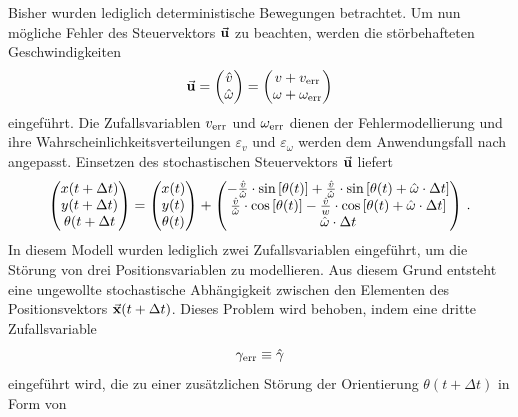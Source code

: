 Bisher wurden lediglich deterministische Bewegungen betrachtet. Um nun mögliche Fehler des Steuervektors $\vec{\mathbf{u}}$ zu beachten, werden die störbehafteten Geschwindigkeiten
\begin{equation}
\vec{\mathbf{u}} = \begin{pmatrix}
\hat{v} \\ \hat{\omega}
\end{pmatrix} = \begin{pmatrix}
v + v_{\text{err}} \\ \omega + \omega_{\text{err}}
\end{pmatrix}
\end{equation}
eingeführt. Die Zufallsvariablen $v_{\text{err}}$ und $\omega_{\text{err}}$ dienen der Fehlermodellierung und ihre Wahrscheinlichkeitsverteilungen $\varepsilon_v$ und $\varepsilon_\omega$ werden dem Anwendungsfall nach angepasst. Einsetzen des stochastischen Steuervektors $\vec{\mathbf{u}}$ liefert
\begin{equation}
\begin{pmatrix}
x(t+\Delta t) \\ y(t+\Delta t) \\ \theta(t+\Delta t
\end{pmatrix} 
=
\begin{pmatrix}
x(t) \\ y(t) \\ \theta(t)
\end{pmatrix} + \begin{pmatrix}
-\frac{\hat{v}}{\hat{\omega}}\cdot\text{sin}\left[ {\theta(t)} \right] + \frac{\hat{v}}{\hat{\omega}}\cdot \text{sin}\left[ {\theta(t)+\hat{\omega} \cdot \Delta t} \right] \\
\frac{\hat{v}}{\hat{\omega}}\cdot \text{cos}\left[ {\theta(t)} \right] - \frac{\hat{v}}{w}\cdot \text{cos}\left[ {\theta(t)+\hat{\omega} \cdot \Delta t} \right]\\
\hat{\omega}\cdot \Delta t
\end{pmatrix}\,.
\end{equation}
In diesem Modell wurden lediglich zwei Zufallsvariablen eingeführt, um die Störung von drei Positionsvariablen zu modellieren. Aus diesem Grund entsteht eine ungewollte stochastische Abhängigkeit zwischen den Elementen des Positionsvektors $\vec{\mathbf{x}}(t+\Delta t)$. Dieses Problem wird behoben, indem eine dritte Zufallsvariable
\begin{equation}
\gamma_{\text{err}} \equiv \hat{\gamma}
\end{equation}
eingeführt wird, die zu einer zusätzlichen Störung der Orientierung $\theta(t+\Delta t)$ in Form von
